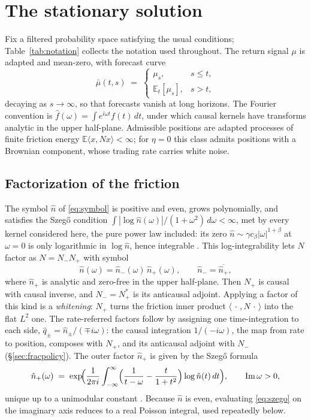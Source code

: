 \documentclass[11pt]{article}
\newcommand{\E}{\mathbb{E}}
\theoremstyle{plain}
\theoremstyle{definition}
\theoremstyle{remark}
\begin{document}
\section{The stationary solution}\label{sec:interior}

Fix a filtered probability space satisfying the usual conditions; Table~\ref{tab:notation} collects the notation used throughout. The return signal $\mu$ is adapted and mean-zero, with forecast curve
\[
\bar\mu(t,s) \;=\; \begin{cases}\mu_s, & s\le t,\\[2pt] \E_t[\mu_s], & s>t,\end{cases}
\]
decaying as $s\to\infty$, so that forecasts vanish at long horizons. The Fourier convention is $\hat f(\omega)=\int e^{i\omega t}f(t)\,dt$, under which causal kernels have transforms analytic in the upper half-plane. Admissible positions are adapted processes of finite friction energy $\E\langle x,Nx\rangle<\infty$; for $\eta=0$ this class admits positions with a Brownian component, whose trading rate carries white noise.

\subsection{Factorization of the friction}\label{sec:setup}

The symbol $\hat n$ of \eqref{eq:symbol} is positive and even, grows polynomially, and satisfies the Szeg\H{o} condition $\int|\log\hat n(\omega)|/(1+\omega^2)\,d\omega<\infty$, met by every kernel considered here, the pure power law included: its zero $\hat n\sim\gamma c_\beta|\omega|^{1+\beta}$ at $\omega=0$ is only logarithmic in $\log\hat n$, hence integrable \citep{Krein1962}. This log-integrability lets $N$ factor as $N=N_-N_+$ with symbol
\begin{equation}\label{eq:wh}
\hat n(\omega) = \hat n_-(\omega)\,\hat n_+(\omega), \qquad \hat n_- = \overline{\hat n_+},
\end{equation}
where $\hat n_+$ is analytic and zero-free in the upper half-plane. Then $N_+$ is causal with causal inverse, and $N_-=N_+^*$ is its anticausal adjoint. Applying a factor of this kind is a \emph{whitening}: $N_+$ turns the friction inner product $\langle\,\cdot\,,N\,\cdot\,\rangle$ into the flat $L^2$ one. The rate-referred factors follow by assigning one time-integration to each side, $\hat q_\pm=\hat n_\pm/(\mp i\omega)$: the causal integration $1/(-i\omega)$, the map from rate to position, composes with $N_+$, and its anticausal adjoint with $N_-$ (\S\ref{sec:fracpolicy}). The outer factor $\hat n_+$ is given by the Szeg\H{o} formula
\begin{equation}\label{eq:szego}
\hat n_+(\omega) \;=\; \exp\!\Bigl(\frac{1}{2\pi i}\int_{-\infty}^{\infty}\Bigl(\frac{1}{t-\omega}-\frac{t}{1+t^2}\Bigr)\log \hat n(t)\,dt\Bigr), \qquad \operatorname{Im}\omega>0,
\end{equation}
unique up to a unimodular constant \citep{Krein1962}. Because $\hat n$ is even, evaluating \eqref{eq:szego} on the imaginary axis reduces to a real Poisson integral, used repeatedly below.
\end{document}

